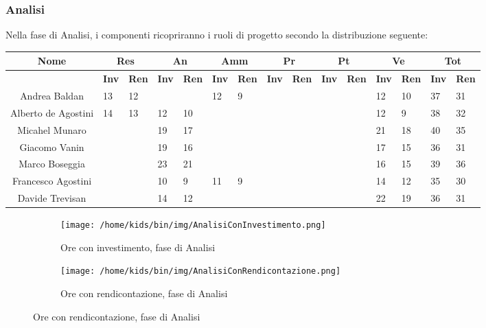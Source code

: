 \documentclass{scalatekids-article}
\begin{document}
\subsubsection{Analisi}
Nella fase di Analisi, i componenti ricopriranno i ruoli di progetto secondo la distribuzione seguente:
\begin{center}
  \scriptsize
  \begin{tabular}{| c | p{0.35cm} p{0.35cm} | p{0.35cm} p{0.35cm} | p{0.35cm} p{0.35cm} | p{0.35cm} p{0.35cm} | p{0.35cm} p{0.35cm} | p{0.35cm} p{0.35cm} | p{0.35cm} p{0.35cm} |}
    \hline
    \textbf{Nome} & \multicolumn{2}{|c|}{\textbf{Res}} & \multicolumn{2}{|c|}{\textbf{An}} & \multicolumn{2}{|c|}{\textbf{Amm}} & \multicolumn{2}{|c|}{\textbf{Pr}} & \multicolumn{2}{|c|}{\textbf{Pt}} & \multicolumn{2}{|c|}{\textbf{Ve}} & \multicolumn{2}{|c|}{\textbf{Tot}}\\
    \hline
    & \textbf{Inv} & \textbf{Ren} & \textbf{Inv} & \textbf{Ren} & \textbf{Inv} & \textbf{Ren} & \textbf{Inv} & \textbf{Ren} & \textbf{Inv} & \textbf{Ren} & \textbf{Inv} & \textbf{Ren} & \textbf{Inv} & \textbf{Ren}\\
    \hline
    Andrea Baldan & 13 & 12 & & & 12 & 9 & & & & & 12 & 10 & 37 & 31\\
    Alberto de Agostini & 14 & 13 & 12 & 10 & & & & & & & 12 & 9 & 38 & 32\\
    Micahel Munaro & & & 19 & 17 & & & & & & & 21 & 18 & 40 & 35\\
    Giacomo Vanin & & & 19 & 16 & & & & & & & 17 & 15 & 36 & 31\\
    Marco Boseggia & & & 23 & 21 & & & & & & & 16 & 15 & 39 & 36\\
    Francesco Agostini & & & 10 & 9 & 11 & 9 & & & & & 14 & 12 & 35 & 30\\
    Davide Trevisan & & & 14 & 12 & & & & & & & 22 & 19 & 36 & 31\\
    \hline
  \end{tabular}
\end{center}
\begin{figure}[H]
  \begin{subfigure}[H]{0.47\textwidth}
    \texttt{[image: /home/kids/bin/img/AnalisiConInvestimento.png]}
    \caption{Ore con investimento, fase di Analisi}
  \end{subfigure}
  \qquad
  \begin{subfigure}[H]{0.47\textwidth}
    \texttt{[image: /home/kids/bin/img/AnalisiConRendicontazione.png]}
    \caption{Ore con rendicontazione, fase di Analisi}
  \end{subfigure}
\end{figure}
\end{document}
